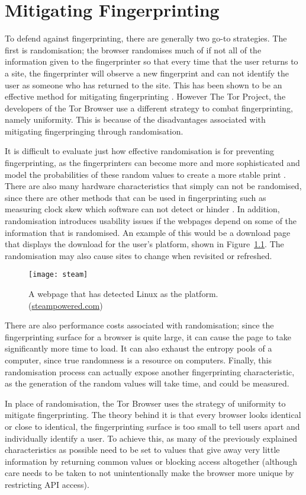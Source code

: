 \chapter{Mitigating Fingerprinting}

To defend against fingerprinting, there are generally two go-to strategies.
The first is randomisation; the browser randomises much of if not all of the information given to the fingerprinter so that every time that the user returns to a site, the fingerprinter will observe a new fingerprint and can not identify the user as someone who has returned to the site.
This has been shown to be an effective method for mitigating fingerprinting \citep{privaricator}.
However The Tor Project, the developers of the Tor Browser use a different strategy to combat fingerprinting, namely uniformity.
This is because of the disadvantages associated with mitigating fingerpringing through randomisation.

It is difficult to evaluate just how effective randomisation is for preventing fingerprinting, as the fingerprinters can become more and more sophisticated and model the probabilities of these random values to create a more stable print \citep{tor-project}.
There are also many hardware characteristics that simply can not be randomised, since there are other methods that can be used in fingerprinting such as measuring clock skew which software can not detect or hinder \citep{skew}.
In addition, randomisation introduces usability issues if the webpages depend on some of the information that is randomised.
An example of this would be a download page that displays the download for the user's platform, shown in Figure~\ref{fig:steam}.
The randomisation may also cause sites to change when revisited or refreshed.

\begin{figure}[h]
\texttt{[image: steam]}
\centering
\caption{A webpage that has detected Linux as the platform. (\url{steampowered.com})}
\label{fig:steam}
\end{figure}

There are also performance costs associated with randomisation; since the fingerprinting surface for a browser is quite large, it can cause the page to take significantly more time to load.
It can also exhaust the entropy pools of a computer, since true randomness is a resource on computers.
Finally, this randomisation process can actually expose another fingerprinting characteristic, as the generation of the random values will take time, and could be measured.

In place of randomisation, the Tor Browser uses the strategy of uniformity to mitigate fingerprinting.
The theory behind it is that every browser looks identical or close to identical, the fingerprinting surface is too small to tell users apart and individually identify a user.
To achieve this, as many of the previously explained characteristics as possible need to be set to values that give away very little information by returning common values or blocking access altogether (although care needs to be taken to not unintentionally make the browser more unique by restricting API access).

